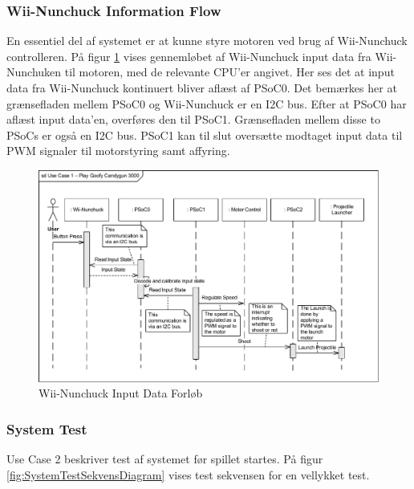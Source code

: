 \subsubsection{Wii-Nunchuck Information Flow}
En essentiel del af systemet er at kunne styre motoren ved brug af Wii-Nunchuck controlleren. På figur \ref{fig:WiiNunchuckSekvensDiagram} vises gennemløbet af Wii-Nunchuck input data fra Wii-Nunchuken til motoren, med de relevante CPU'er angivet. Her ses det at input data fra Wii-Nunchuck kontinuert bliver aflæst af PSoC0. Det bemærkes her at grænsefladen mellem PSoC0 og Wii-Nunchuck er en I2C bus. Efter at PSoC0 har aflæst input data'en, overføres den til PSoC1. Grænsefladen mellem disse to PSoCs er også en I2C bus. PSoC1 kan til slut oversætte modtaget input data til PWM signaler til motorstyring samt affyring.

\begin{figure}[H]
	\centering
	\includegraphics[width=\textwidth] {Systemarkitektur/images/SequenceDiagramUC1}
	\caption{Wii-Nunchuck Input Data Forløb}
	\label{fig:WiiNunchuckSekvensDiagram}
\end{figure}

\subsubsection{System Test}
Use Case 2 beskriver test af systemet før spillet startes. På figur \ref{fig:SystemTestSekvensDiagram} vises test sekvensen for en vellykket test. 

